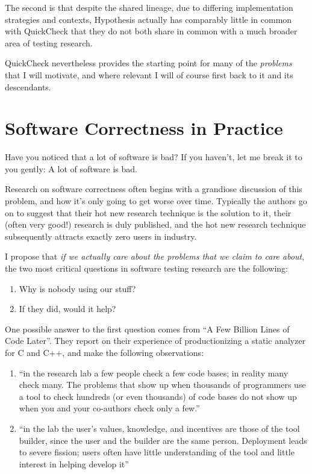 The second is that despite the shared lineage,
due to differing implementation strategies and contexts,
Hypothesis actually has comparably little in common with QuickCheck that they do not both share in common with a much broader area of testing research.

QuickCheck nevertheless provides the starting point for many of the \emph{problems} that I will motivate,
and where relevant I will of course first back to it and its descendants.

\chapter{Software Correctness in Practice}

Have you noticed that a lot of software is bad?
If you haven't,
let me break it to you gently:
A lot of software is bad.

Research on software correctness often begins with a grandiose discussion of this problem,
and how it's only going to get worse over time.
Typically the authors go on to suggest that their hot new research technique is the solution to it,
their (often very good!) research is duly published,
and the hot new research technique subsequently attracts exactly zero users in industry.

I propose that \emph{if we actually care about the problems that we claim to care about},
the two most critical questions in software testing research are the following:

\begin{enumerate}
\item Why is nobody using our stuff?
\item If they did, would it help?
\end{enumerate}

One possible answer to the first question comes from ``A Few Billion Lines of Code Later''\cite{DBLP:journals/cacm/BesseyBCCFHHKME10}.
They report on their experience of productionizing a static analyzer for C and C++,
and make the following observations:

\begin{enumerate}
\item ``in the research lab a few people check a few code bases; in reality many check many. The problems that show up when thousands of programmers use a tool to check hundreds (or even thousands) of code bases do not show up when you and your co-authors check only a few.''
\item ``in the lab the user's values, knowledge, and incentives are those of the tool builder, since the user and the builder are the same person. Deployment leads to severe fission; users often have little understanding of the tool and little interest in helping develop it''
\end{enumerate}

